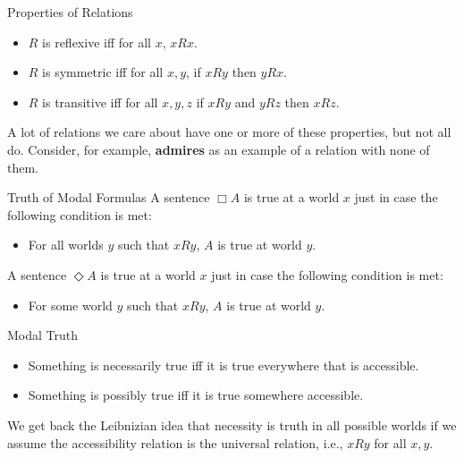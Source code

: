 \documentclass[
  14pt,
  letterpaper,
  ignorenonframetext,
  aspectratio=169,
  handout]{beamer}
\providecommand{\tightlist}{%
  \setlength{\itemsep}{0pt}\setlength{\parskip}{0pt}}\usepackage{longtable,booktabs,array}
\begin{document}
\begin{frame}{Properties of Relations}
\protect\hypertarget{properties-of-relations}{}
\begin{itemize}[<+->]
\tightlist
\item
  \(R\) is reflexive iff for all \(x\), \(xRx\).
\item
  \(R\) is symmetric iff for all \(x, y\), if \(xRy\) then \(yRx\).
\item
  \(R\) is transitive iff for all \(x, y, z\) if \(xRy\) and \(yRz\)
  then \(xRz\).
\end{itemize}

A lot of relations we care about have one or more of these properties,
but not all do. Consider, for example, \textbf{admires} as an example of
a relation with none of them.
\end{frame}

\begin{frame}{Truth of Modal Formulas}
\protect\hypertarget{truth-of-modal-formulas}{}
A sentence \(\Box A\) is true at a world \(x\) just in case the
following condition is met:

\begin{itemize}[<+->]
\tightlist
\item
  For all worlds \(y\) such that \(xRy\), \(A\) is true at world \(y\).
\end{itemize}

A sentence \(\Diamond A\) is true at a world \(x\) just in case the
following condition is met:

\begin{itemize}[<+->]
\tightlist
\item
  For some world \(y\) such that \(xRy\), \(A\) is true at world \(y\).
\end{itemize}
\end{frame}

\begin{frame}{Modal Truth}
\protect\hypertarget{modal-truth}{}
\begin{itemize}[<+->]
\tightlist
\item
  Something is necessarily true iff it is true everywhere that is
  accessible.
\item
  Something is possibly true iff it is true somewhere accessible.
\end{itemize}

We get back the Leibnizian idea that necessity is truth in all possible
worlds if we assume the accessibility relation is the universal
relation, i.e., \(xRy\) for all \(x, y\).
\end{frame}
\end{document}

